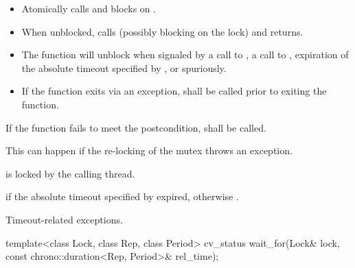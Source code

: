 \begin{itemdescr}
\pnum\effects

\begin{itemize}
\item
Atomically calls  and blocks on .

\item
When unblocked, calls  (possibly blocking on the lock) and returns.

\item
The function will unblock when signaled by a call to , a call to ,
expiration of the absolute timeout specified by ,
or spuriously.

\item
If the function exits via an exception,  shall be called prior to exiting the function.
\end{itemize}

\pnum
\remarks
If the function fails to meet the postcondition, 
shall be called.
\begin{note} This can happen if the re-locking of the mutex throws an exception. \end{note}

\pnum
\postconditions {} is locked by the calling thread.

\pnum
\returns {} if
the absolute timeout specified by  expired,
otherwise .

\pnum
\throws Timeout-related
exceptions.

\end{itemdescr}

%
\begin{itemdecl}
template<class Lock, class Rep, class Period>
  cv_status wait_for(Lock& lock, const chrono::duration<Rep, Period>& rel_time);
\end{itemdecl}

